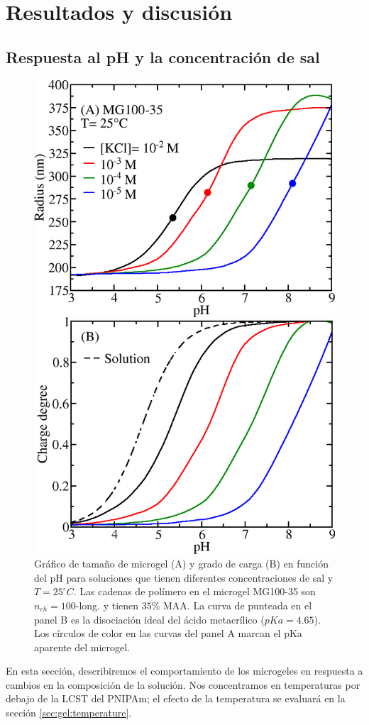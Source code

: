 \section{Resultados y discusi\'on}



\subsection{Respuesta al pH y la concentraci\'on de sal}\label{sec:gel:pH_salt}


\begin{figure}[!ht]
\centering
\includegraphics[width=0.5\linewidth]{Figures/graph-gel/R-pH.png}
\caption{Gr\'afico de tama\~no de microgel (A) y grado de carga (B) en funci\'on del pH para soluciones que tienen diferentes concentraciones de sal y $T=25 ^\circ C$.
	Las cadenas de pol\'imero en el microgel MG100-35 son $n_{ch}=100$-long. y tienen $35\% $ MAA.
	La curva de  punteada en el panel B es la disociaci\'on ideal del \'acido metacr\'ilico ($pKa=4.65$).
	Los c\'irculos de color en las curvas del panel A marcan el pKa aparente del microgel.}
\label{fig:gel:R-pH}
\end{figure}

En esta secci\'on, describiremos el comportamiento de los microgeles en respuesta a cambios en la composici\'on de la soluci\'on.
Nos concentramos en temperaturas por debajo de la LCST del PNIPAm;
el efecto de la temperatura se evaluar\'a en la secci\'on \ref{sec:gel:temperature}. 


